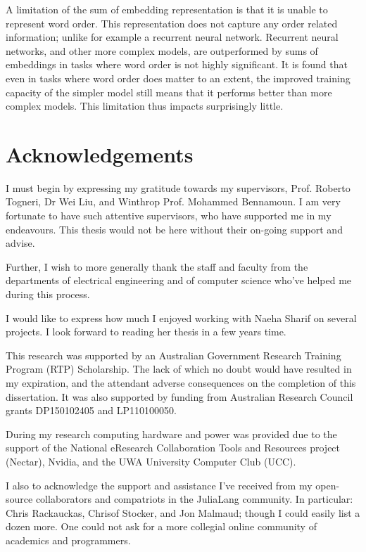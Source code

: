 \documentclass{book}
\begin{document}
A limitation of the sum of embedding representation is that it is unable to represent word order.
This representation does not capture any order related information; unlike for example a recurrent neural network.
Recurrent neural networks, and other more complex models, are outperformed by sums of embeddings in tasks where word order is not highly significant.
It is found that even in tasks where word order does matter to an extent, the improved training capacity of the simpler model still means that it performs better than more complex models.
This limitation thus impacts surprisingly little.

\chapter*{Acknowledgements}
I must begin by expressing my gratitude towards my supervisors,
Prof. Roberto Togneri, Dr Wei Liu, and Winthrop Prof. Mohammed Bennamoun.
I am very fortunate to have such attentive supervisors,
who have supported me in my endeavours.
This thesis would not be here without their on-going support and advise.

Further, I wish to more generally thank the staff and faculty from the departments of electrical engineering and of computer science who've helped me during this process.

I would like to express how much I enjoyed working with Naeha Sharif on several projects.
I look forward to reading her thesis in a few years time.



This research was supported by an Australian Government Research Training Program (RTP) Scholarship.
The lack of which no doubt would have resulted in my expiration,
and the attendant adverse consequences on the completion of this dissertation.
It was also supported by funding from Australian Research Council grants DP150102405 and LP110100050.

During my research computing hardware and  power was provided due to the support of 
the National eResearch Collaboration Tools and Resources project (Nectar),
Nvidia, and the UWA University Computer Club (UCC).

I also to acknowledge the support and assistance I've received from my open-source collaborators and compatriots in the JuliaLang community.
In particular: Chris Rackauckas, Chrisof Stocker, and Jon Malmaud; though I could easily list a dozen more.
One could not ask for a more collegial online community of academics and programmers.
\end{document}
